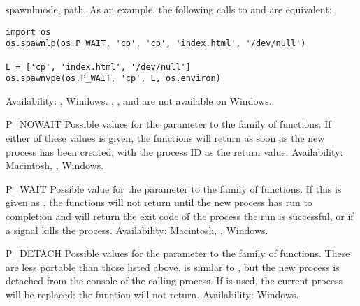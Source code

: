 \begin{funcdesc}{spawnl}{mode, path, \moreargs}
As an example, the following calls to  and
 are equivalent:

\begin{verbatim}
import os
os.spawnlp(os.P_WAIT, 'cp', 'cp', 'index.html', '/dev/null')

L = ['cp', 'index.html', '/dev/null']
os.spawnvpe(os.P_WAIT, 'cp', L, os.environ)
\end{verbatim}

Availability: \UNIX, Windows.  ,
,  and 
are not available on Windows.
\end{funcdesc}

\begin{datadesc}{P_NOWAIT}
Possible values for the  parameter to the 
family of functions.  If either of these values is given, the
 functions will return as soon as the new process
has been created, with the process ID as the return value.
Availability: Macintosh, \UNIX, Windows.
\end{datadesc}

\begin{datadesc}{P_WAIT}
Possible value for the  parameter to the 
family of functions.  If this is given as , the
 functions will not return until the new process
has run to completion and will return the exit code of the process the
run is successful, or  if a signal kills the
process.
Availability: Macintosh, \UNIX, Windows.
\end{datadesc}

\begin{datadesc}{P_DETACH}
Possible values for the  parameter to the
 family of functions.  These are less portable than
those listed above.
 is similar to , but the new
process is detached from the console of the calling process.
If  is used, the current process will be replaced;
the  function will not return.
Availability: Windows.
\end{datadesc}

